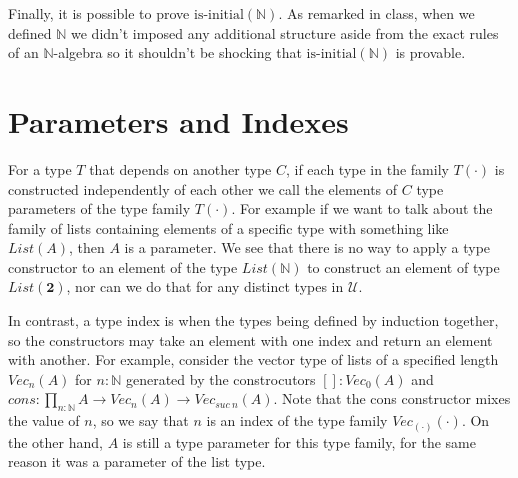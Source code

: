 \documentclass[11pt]{article}
\newcommand{\N}{\mathbb{N}}
\newcommand{\2}{\textbf{2}}
\begin{document}
Finally, it is possible to prove $\text{is-initial}(\N)$. As remarked in class, when we defined $\N$ we didn't imposed any additional structure aside from the exact rules of an $\N$-algebra so it shouldn't be shocking that $\text{is-initial}(\N)$ is provable.



\section{Parameters and Indexes}

For a type $T$ that depends on another type $C$, if each type in the family $T(\cdot)$ is constructed independently of each other we call the elements of $C$ type parameters of the type family $T(\cdot)$.
For example if we want to talk about the family of lists containing elements of a specific type with something like $List(A)$, then $A$ is a parameter.
We see that there is no way to apply a type constructor to an element of the type $List(\N)$ to construct an element of type $List(\2)$, nor can we do that for any distinct types in $\mathcal{U}$.

In contrast, a type index is when the types being defined by induction together, so the constructors may take an element with one index and return an element with another.
For example, consider the vector type of lists of a specified length $Vec_n(A)$ for $n : \N$ generated by the constrocutors $[] : Vec_0(A)$ and $cons : \prod_{n : \N} A \rightarrow Vec_n(A) \rightarrow Vec_{suc\ n}(A)$.
Note that the cons constructor mixes the value of $n$, so we say that $n$ is an index of the type family $Vec_{(\cdot)}(\cdot)$.
On the other hand, $A$ is still a type parameter for this type family, for the same reason it was a parameter of the list type.
\end{document}
